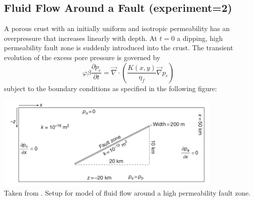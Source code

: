 \subsection*{Fluid Flow Around a Fault (experiment=2)}

A porous crust with an initially uniform and isotropic permeability has an
overpressure that increases linearly with depth. At $t=0$ a dipping, high permeability fault zone is
suddenly introduced into the crust.
The transient evolution of the excess pore pressure is governed by
\begin{equation}
\varphi \beta  \frac{\partial p_e}{\partial t}
=
\vec\nabla \cdot \left( \frac{K(x,y)}{\eta_f} \vec\nabla p_e  \right) 
\end{equation}
subject to the boundary conditions as specified in the following figure:
\begin{center}
\includegraphics[width=11cm]{python_codes/fieldstone_128/images/simpson1}\\
{\captionfont Taken from \cite{simp17}. Setup for model of fluid flow around a high permeability fault zone.}
\end{center}

